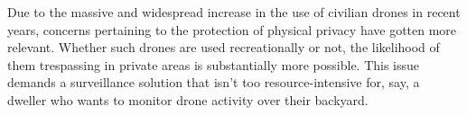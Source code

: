 Due to the massive and widespread increase in the use of civilian drones in recent years, concerns pertaining to the protection of physical privacy have gotten more relevant. Whether such drones are used recreationally or not, the likelihood of them trespassing in private areas is substantially more possible. This issue demands a surveillance solution that isn’t too resource-intensive for, say, a dweller who wants to monitor drone activity over their backyard.
